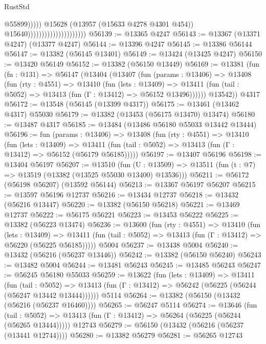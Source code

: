 \begin{lexlean}{RustStd}
\begin{coremodule}
                                                        @55899)))))
                                              @15628
                                              (@13957 (@15633 @4278 @4301 @454))
                                              @15640)))))))))))))))))))))
@56139 := @13365 @4247
@56143 := @13367 (@13371 @4247) (@13377 @4247)
@56144 := @13396 @4247
@56145 := @13386 @56144
@56147 := @13382 (@56145 @13401)
@56149 := @13424 (@13425 @4247)
@56150 := @13420 @56149
@56152 := @13382 (@56150 @13449)
@56169 := @13381
    (fun (fn : @131) =>
    @56147
      (@13404
        (@13407
          (fun (params : @13406) =>
          @13408
            (fun (rty : @4551) =>
            @13410
              (fun (lets : @13409) =>
              @13411 (fun (tail : @5052) => @13413 (fun (Γ : @13412) => @56152 @13496))))))
        @13542))
    @4317
@56172 := @13548 (@56145 (@13399 @4317))
@56175 := @13461 (@13462 @4317) @55030
@56179 := @13382 (@13453 (@56175 @13470) @13474)
@56180 := @13487 @4317
@56185 := @13484 (@13486 @56180 @55033 @13442 @13444)
@56196 := fun (params : @13406) =>
  @13408
    (fun (rty : @4551) =>
    @13410
      (fun (lets : @13409) =>
      @13411 (fun (tail : @5052) => @13413 (fun (Γ : @13412) => @56152 (@56179 @56185)))))
@56197 := @13407 @56196
@56198 := @13404 @56197
@56207 := @13510
    (fun (U : @13509) => @13511 (fun (t : @7) => @13519 (@13382 (@13525 @55030 @13400) @13536)))
@56211 := @56172 (@56198 @56207) (@13592 @56144)
@56213 := @13367 @56197 @56207
@56215 := @13597 @56196 @12737
@56216 := @13434 @12737
@56218 := @13432 (@56216 @13447)
@56220 := @13382 (@56150 @56218)
@56221 := @13469 @12737
@56222 := @56175 @56221
@56223 := @13453 @56222
@56225 := @13382 (@56223 @13474)
@56236 := @13600
    (fun (rty : @4551) =>
    @13410
      (fun (lets : @13409) =>
      @13411 (fun (tail : @5052) => @13413 (fun (Γ : @13412) => @56220 (@56225 @56185)))))
    @5004
@56237 := @13438 @5004
@56240 := @13432 (@56216 (@56237 @13446))
@56242 := @13382 (@56150 @56240)
@56243 := @13482 @5004
@56244 := @13481 @56243
@56245 := @13485 @56243
@56247 := @56245 @56180 @55033
@56259 := @13622
    (fun (lets : @13409) =>
    @13411
      (fun (tail : @5052) =>
      @13413 (fun (Γ : @13412) => @56242 (@56225 (@56244 (@56247 @13442 @13444))))))
    @5114
@56264 := @13382 (@56150 (@13432 (@56216 (@56237 @16460))))
@56265 := @56247 @5114
@56274 := @13646
    (fun (tail : @5052) => @13413 (fun (Γ : @13412) => @56264 (@56225 (@56244 (@56265 @13444)))))
    @12743
@56279 := @56150 (@13432 (@56216 (@56237 (@13441 @12744))))
@56280 := @13382 @56279
@56281 := @56265 @12743

\end{coremodule}
\end{lexlean}
